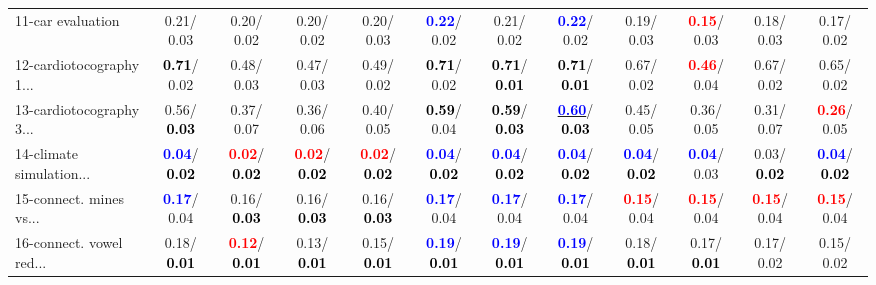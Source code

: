 \begin{table}[h]
\begin{center}
{\begin{tabular}{lc|c|c|c|c|c|c|c|c|c|c}
11-car evaluation &   0.21/  0.03 &   0.20/  0.02 &   0.20/  0.02 &   0.20/  0.03 & \textcolor{blue}{\textbf{  0.22}}/  0.02 &   0.21/  0.02 & \textcolor{blue}{\textbf{  0.22}}/  0.02 &   0.19/  0.03 & \textcolor{red}{\textbf{  0.15}}/  0.03 &   0.18/  0.03 &   0.17/  0.02 \\
12-cardiotocography 1... & \textcolor{black}{\textbf{  0.71}}/  0.02 &   0.48/  0.03 &   0.47/  0.03 &   0.49/  0.02 & \textcolor{black}{\textbf{  0.71}}/  0.02 & \textcolor{black}{\textbf{  0.71}}/\textcolor{black}{\textbf{  0.01}} & \textcolor{black}{\textbf{  0.71}}/\textcolor{black}{\textbf{  0.01}} &   0.67/  0.02 & \textcolor{red}{\textbf{  0.46}}/  0.04 &   0.67/  0.02 &   0.65/  0.02 \\
13-cardiotocography 3... &   0.56/\textcolor{black}{\textbf{  0.03}} &   0.37/  0.07 &   0.36/  0.06 &   0.40/  0.05 & \textcolor{black}{\textbf{  0.59}}/  0.04 & \textcolor{black}{\textbf{  0.59}}/\textcolor{black}{\textbf{  0.03}} & \underline{\textcolor{blue}{\textbf{  0.60}}}/\textcolor{black}{\textbf{  0.03}} &   0.45/  0.05 &   0.36/  0.05 &   0.31/  0.07 & \textcolor{red}{\textbf{  0.26}}/  0.05 \\
14-climate simulation... & \textcolor{blue}{\textbf{  0.04}}/\textcolor{black}{\textbf{  0.02}} & \textcolor{red}{\textbf{  0.02}}/\textcolor{black}{\textbf{  0.02}} & \textcolor{red}{\textbf{  0.02}}/\textcolor{black}{\textbf{  0.02}} & \textcolor{red}{\textbf{  0.02}}/\textcolor{black}{\textbf{  0.02}} & \textcolor{blue}{\textbf{  0.04}}/\textcolor{black}{\textbf{  0.02}} & \textcolor{blue}{\textbf{  0.04}}/\textcolor{black}{\textbf{  0.02}} & \textcolor{blue}{\textbf{  0.04}}/\textcolor{black}{\textbf{  0.02}} & \textcolor{blue}{\textbf{  0.04}}/\textcolor{black}{\textbf{  0.02}} & \textcolor{blue}{\textbf{  0.04}}/  0.03 &   0.03/\textcolor{black}{\textbf{  0.02}} & \textcolor{blue}{\textbf{  0.04}}/\textcolor{black}{\textbf{  0.02}} \\ \hline
15-connect. mines vs... & \textcolor{blue}{\textbf{  0.17}}/  0.04 &   0.16/\textcolor{black}{\textbf{  0.03}} &   0.16/\textcolor{black}{\textbf{  0.03}} &   0.16/\textcolor{black}{\textbf{  0.03}} & \textcolor{blue}{\textbf{  0.17}}/  0.04 & \textcolor{blue}{\textbf{  0.17}}/  0.04 & \textcolor{blue}{\textbf{  0.17}}/  0.04 & \textcolor{red}{\textbf{  0.15}}/  0.04 & \textcolor{red}{\textbf{  0.15}}/  0.04 & \textcolor{red}{\textbf{  0.15}}/  0.04 & \textcolor{red}{\textbf{  0.15}}/  0.04 \\
16-connect. vowel red... &   0.18/\textcolor{black}{\textbf{  0.01}} & \textcolor{red}{\textbf{  0.12}}/\textcolor{black}{\textbf{  0.01}} &   0.13/\textcolor{black}{\textbf{  0.01}} &   0.15/\textcolor{black}{\textbf{  0.01}} & \textcolor{blue}{\textbf{  0.19}}/\textcolor{black}{\textbf{  0.01}} & \textcolor{blue}{\textbf{  0.19}}/\textcolor{black}{\textbf{  0.01}} & \textcolor{blue}{\textbf{  0.19}}/\textcolor{black}{\textbf{  0.01}} &   0.18/\textcolor{black}{\textbf{  0.01}} &   0.17/\textcolor{black}{\textbf{  0.01}} &   0.17/  0.02 &   0.15/  0.02 \\

\end{tabular}}
\end{center}
\end{table}
